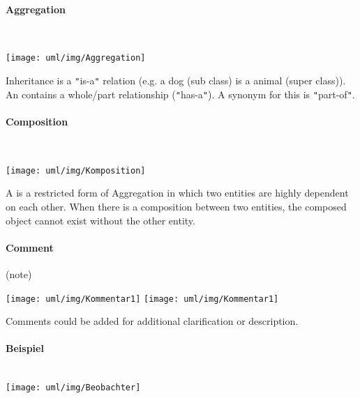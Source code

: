 \begin{minipage}[c]{0.45\linewidth}
\paragraph{Aggregation}\mbox{} \\
\begin{minipage}[c]{0.28\linewidth}
\texttt{[image: uml/img/Aggregation]}
\end{minipage}
\begin{minipage}[c]{0.7\linewidth}
Inheritance is a \verb|"|is-a\verb|"| relation (e.g. a dog (sub class) is a animal
(super class)). An  contains a whole/part
relationship (\verb|"|has-a\verb|"|). A synonym for this is \verb|"|part-of\verb|"|.
\end{minipage}
%
\ifslides
\newpage
\fi
\paragraph{Composition}\mbox{} \\
\begin{minipage}[c]{0.28\linewidth}
\texttt{[image: uml/img/Komposition]}
\end{minipage}
\begin{minipage}[c]{0.7\linewidth}
A  is a restricted form of Aggregation in which two
entities are highly dependent on each other. When there is a composition
between two entities, the composed object cannot exist without the other entity.
\end{minipage}
%
\ifslides
\newpage
\fi
\paragraph{Comment} (note)\\[2ex]
\begin{minipage}[c]{0.3\linewidth}
\ifslides
\texttt{[image: uml/img/Kommentar1]}
\else
\texttt{[image: uml/img/Kommentar1]}
\fi
\end{minipage}
\begin{minipage}[c]{0.69\linewidth}
Comments could be added for additional clarification or description.
\end{minipage}
%
\newpage
\ifslides
\paragraph{Beispiel}\ \\
\texttt{[image: uml/img/Beobachter]}
\else

\end{minipage}
